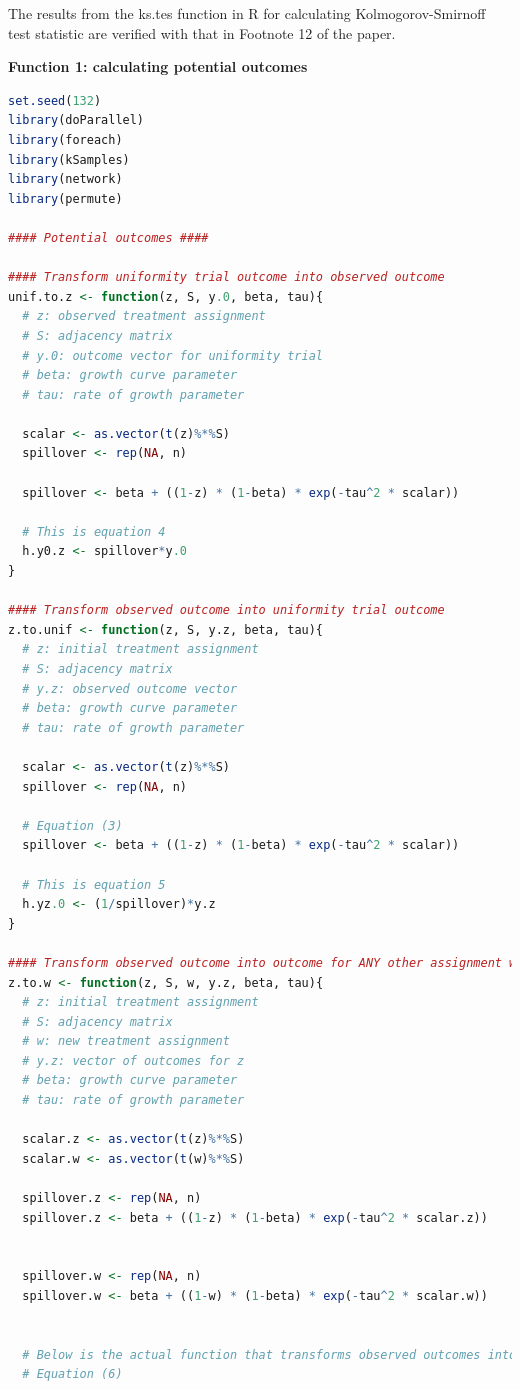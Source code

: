 \documentclass[12pt]{article}
\begin{document}
The results from the ks.tes function in R for calculating Kolmogorov-Smirnoff test statistic are verified with that in Footnote 12 of the paper.


\textbf{Function 1: calculating potential outcomes}

\begin{lstlisting}[language=R]
set.seed(132)
library(doParallel)
library(foreach)
library(kSamples)
library(network)
library(permute)

#### Potential outcomes ####

#### Transform uniformity trial outcome into observed outcome
unif.to.z <- function(z, S, y.0, beta, tau){
  # z: observed treatment assignment
  # S: adjacency matrix
  # y.0: outcome vector for uniformity trial
  # beta: growth curve parameter
  # tau: rate of growth parameter
  
  scalar <- as.vector(t(z)%*%S)
  spillover <- rep(NA, n)
  
  spillover <- beta + ((1-z) * (1-beta) * exp(-tau^2 * scalar))
  
  # This is equation 4
  h.y0.z <- spillover*y.0
}

#### Transform observed outcome into uniformity trial outcome
z.to.unif <- function(z, S, y.z, beta, tau){
  # z: initial treatment assignment
  # S: adjacency matrix
  # y.z: observed outcome vector
  # beta: growth curve parameter
  # tau: rate of growth parameter

  scalar <- as.vector(t(z)%*%S)
  spillover <- rep(NA, n)
  
  # Equation (3)
  spillover <- beta + ((1-z) * (1-beta) * exp(-tau^2 * scalar))
  
  # This is equation 5
  h.yz.0 <- (1/spillover)*y.z
}

#### Transform observed outcome into outcome for ANY other assignment w
z.to.w <- function(z, S, w, y.z, beta, tau){
  # z: initial treatment assignment
  # S: adjacency matrix
  # w: new treatment assignment
  # y.z: vector of outcomes for z
  # beta: growth curve parameter
  # tau: rate of growth parameter
  
  scalar.z <- as.vector(t(z)%*%S)
  scalar.w <- as.vector(t(w)%*%S)
  
  spillover.z <- rep(NA, n)
  spillover.z <- beta + ((1-z) * (1-beta) * exp(-tau^2 * scalar.z))
  
  
  spillover.w <- rep(NA, n)
  spillover.w <- beta + ((1-w) * (1-beta) * exp(-tau^2 * scalar.w))
  
  
  # Below is the actual function that transforms observed outcomes into potential outcomes
  # Equation (6)
  

\end{lstlisting}
\end{document}
